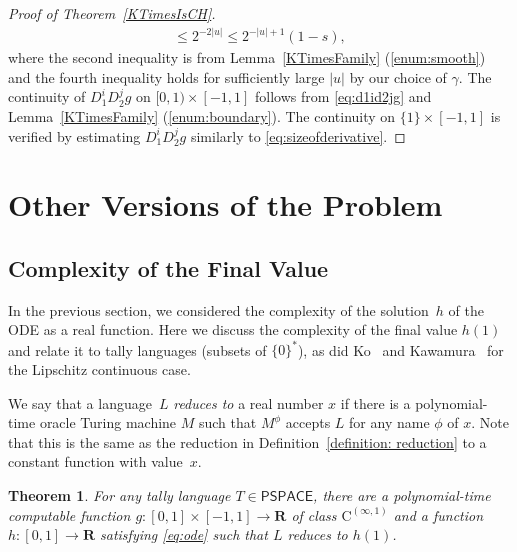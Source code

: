 \documentclass{lmcs}
\newtheorem{theorem}{Theorem}%
\theoremstyle{definition}
\theoremstyle{remark}
\newcommand{\R}{\mathbf R}
\newcommand{\D}{D}
\newcommand{\classPSPACE}{\mathsf{PSPACE}}
\newcommand{\classCH}{\mathsf{CH}}
\newcommand{\classC}{\mathrm C}
\begin{document}
\begin{proof}[Proof of Theorem~\ref{KTimesIsCH}]
\begin{align}
  \le 2^{-2 \lvert u \rvert}
  \le 2^{-\lvert u \rvert + 1} (1 - s), 
  \label{eq:sizeofderivative}
 \end{align}
where the second inequality is from 
Lemma~\ref{KTimesFamily} (\ref{enum:smooth})
and the fourth inequality holds for sufficiently large $\lvert u \rvert$
by our choice of $\gamma$. 
The continuity of $\D _1 ^i \D _2 ^j g$ on $[0,1) \times [-1, 1]$ follows
from \eqref{eq:d1id2jg} and Lemma~\ref{KTimesFamily} (\ref{enum:boundary}).
The continuity on $\{1\} \times [-1, 1]$ is verified by 
estimating $\D_1^{i} \D_2^{j} g$ similarly to \eqref{eq:sizeofderivative}. 
\end{proof} 

\section{Other Versions of the Problem}

\subsection{Complexity of the Final Value}
\label{section: final value}
In the previous section, 
we considered the complexity of the solution~$h$ of the ODE as a real function. 
Here we discuss the complexity of the final value $h (1)$ and
relate it to tally languages (subsets of $\{0\}^*$), 
as did 
Ko~\cite{ko1983computational} and 
Kawamura~\cite[Theorem~5.1]{kawamura2010complexity}
for the Lipschitz continuous case.

We say that a language~$L$ \emph{reduces to} a real number $x$ 
if there is a polynomial-time oracle Turing machine $M$ 
such that $M^\phi$ accepts $L$ for any name $\phi$ of $x$.
Note that this is the same as 
the reduction in Definition~\ref{definition: reduction}
to a constant function with value~$x$. 


\begin{theorem}
\label{theorem: final value of once}
For any tally language $T \in \classPSPACE$,
there are a polynomial-time computable function
$g \colon [0,1] \times [-1,1] \to \R$ 
of class $\classC ^{(\infty, 1)}$ and 
a function $h \colon [0,1] \to \R$
satisfying \eqref{eq:ode} 
such that $L$ reduces to $h(1)$.
\end{theorem}
\end{document}
